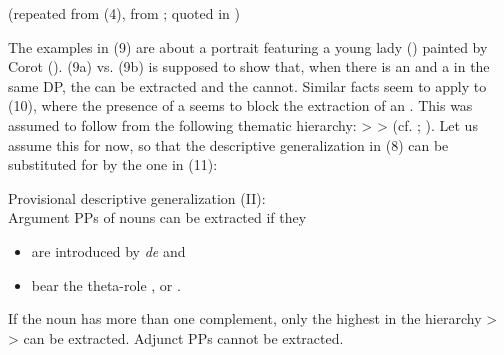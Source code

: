 \documentclass[output=paper]{langsci/langscibook}
\begin{document}
\ea%
    (repeated from (4), from \citealt{Milner1978,Milner1982}; quoted in \citealt{Sag1994})\label{ex:mensch:10}\\
    \z
\z

The examples in (9) are about a portrait featuring a young lady (\THEME) painted by Corot (\AGENT). (9a) vs. (9b) is supposed to show that, when there is an \AGENT and a \THEME in the same DP, the \AGENT can be extracted and the \THEME cannot. Similar facts seem to apply to (10), where the presence of a \POSSESSOR seems to block the extraction of an \AGENT. This was assumed to follow from the following thematic hierarchy: \POSSESSOR > \AGENT > \THEME (cf. \citealt{Pollock1989}; \citealt{Godard1992}). Let us assume this for now, so that the descriptive generalization in (8) can be substituted for by the one in (11):

\begin{exe}
\ex%
    \label{ex:mensch:11}
Provisional descriptive generalization (II):\\
          Argument PPs of nouns can be extracted if they
          
            \begin{itemize}
                \item are introduced by \textit{de} and
                \item bear the theta-role \AGENT, \THEME or \POSSESSOR.
            \end{itemize}
If the noun has more than one complement, only the highest in the hierarchy  \POSSESSOR > \AGENT > \THEME can be extracted. Adjunct PPs cannot be extracted.
\end{exe}
\end{document}
